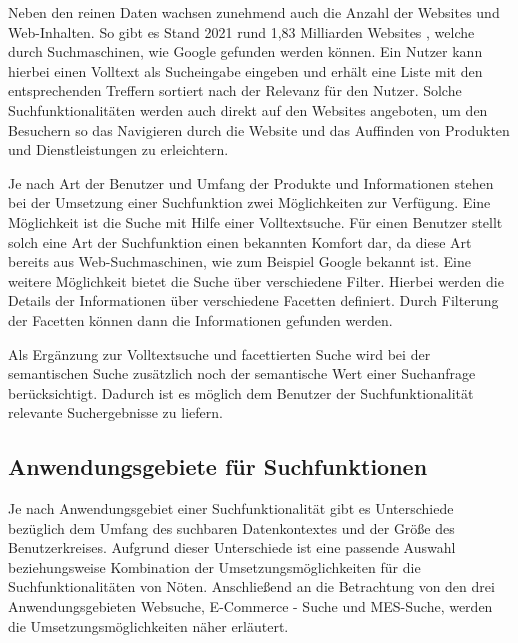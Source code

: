 Neben den reinen Daten wachsen zunehmend auch die Anzahl der Websites und Web-Inhalten. So gibt es Stand 2021 rund 1,83 Milliarden Websites \cite{GuyFawkes.2021}, welche durch Suchmaschinen, wie Google gefunden werden können. Ein Nutzer kann hierbei einen Volltext als Sucheingabe eingeben und erhält eine Liste mit den entsprechenden Treffern sortiert nach der Relevanz für den Nutzer. Solche Suchfunktionalitäten werden auch direkt auf den Websites angeboten, um den Besuchern so das Navigieren durch die Website und das Auffinden von Produkten und Dienstleistungen zu erleichtern.


Je nach Art der Benutzer und Umfang der Produkte und Informationen stehen bei der Umsetzung einer Suchfunktion zwei Möglichkeiten zur Verfügung. Eine Möglichkeit ist die Suche mit Hilfe einer Volltextsuche. Für einen Benutzer stellt solch eine Art der Suchfunktion einen bekannten Komfort dar, da diese Art bereits aus Web-Suchmaschinen, wie zum Beispiel Google bekannt ist. Eine weitere Möglichkeit bietet die Suche über verschiedene Filter. Hierbei werden die Details der Informationen über verschiedene Facetten definiert. Durch Filterung der Facetten können dann die Informationen gefunden werden.

Als Ergänzung zur Volltextsuche und facettierten Suche wird bei der semantischen Suche zusätzlich noch der semantische Wert einer Suchanfrage berücksichtigt. Dadurch ist es möglich dem Benutzer der Suchfunktionalität relevante Suchergebnisse zu liefern.

\subsection{Anwendungsgebiete für Suchfunktionen\label{subsec2.1.1:Unterunterpunkt-1}}

Je nach Anwendungsgebiet einer Suchfunktionalität gibt es Unterschiede bezüglich dem Umfang des suchbaren Datenkontextes und der Größe des Benutzerkreises. Aufgrund dieser Unterschiede ist eine passende Auswahl beziehungsweise Kombination der Umsetzungsmöglichkeiten für die Suchfunktionalitäten von Nöten. Anschließend an die Betrachtung von den drei Anwendungsgebieten \glqq Websuche\grqq{}, \glqq E-Commerce - Suche\grqq{} und \glqq MES-Suche\grqq{}, werden die Umsetzungsmöglichkeiten näher erläutert.

